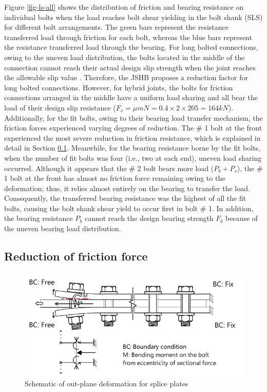 Figure \ref{fig-ls-all} shows the distribution of friction and bearing resistance on individual bolts when the load reaches bolt shear yielding in the bolt shank (SLS) for different bolt arrangements. The green bars represent the resistance transferred load through friction for each bolt, whereas the blue bars represent the resistance transferred load through the bearing. For long bolted connections, owing to the uneven load distribution, the bolts located in the middle of the connection cannot reach their actual design slip strength when the joint reaches the allowable slip value \cite{KAMEI2000,peng2013}. Therefore, the JSHB \cite{douji2017} proposes a reduction factor for long bolted connections. However, for hybrid joints, the bolts for friction connections arranged in the middle have a uniform load sharing and all bear the load of their design slip resistance ($F_s = \mu m N=0.4\times 2 \times 205 = 164 kN$). Additionally, for the fit bolts, owing to their bearing load transfer mechanism, the friction forces experienced varying degrees of reduction. The \# 1 bolt at the front experienced the most severe reduction in friction resistance, which is explained in detail in Section \ref{sec-decoff}. Meanwhile, for the bearing resistance borne by the fit bolts, when the number of fit bolts was four (i.e., two at each end), uneven load sharing occurred. Although it appears that the \# 2 bolt bears more load ($P_b + P_s$), the \# 1 bolt at the front has almost no friction force remaining owing to the deformation; thus, it relies almost entirely on the bearing to transfer the load. Consequently, the transferred bearing resistance was the highest of all the fit bolts, causing the bolt shank shear yield to occur first in bolt \# 1. In addition, the bearing resistance $P_{b}$ cannot reach the design bearing strength $F_b$ because of the uneven bearing load distribution.


\subsection{Reduction of friction force}
\label{sec-decoff}

\begin{figure}
    \centering
    \includegraphics[width=0.7\linewidth]{imgs/ch7/OP-def.pdf}
    \caption{Schematic of out-plane deformation for splice plates}
    \label{fig-OP-def}
\end{figure}


